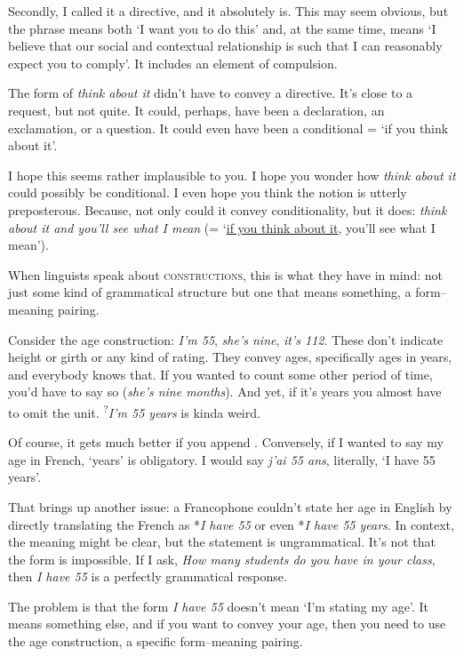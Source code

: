Secondly, I called it a directive, and it absolutely is. This may seem obvious, but the phrase means both `I want you to do this' and, at the same time, means `I believe that our social and contextual relationship is such that I can reasonably expect you to comply'. It includes an element of compulsion.

The form of \textit{think about it} didn't have to convey a directive. It's close to a request, but not quite. It could, perhaps, have been a declaration, an exclamation, or a question. It could even have been a conditional = `if you think about it'.

I hope this seems rather implausible to you. I hope you wonder how \textit{think about it} could possibly be conditional. I even hope you think the notion is utterly preposterous. Because, not only could it convey conditionality, but it does: \textit{think about it and you'll see what I mean} (= `\uline{if you think about it}, you'll see what I mean').

When linguists speak about \textsc{constructions}, this is what they have in mind: not just some kind of grammatical structure but one that means something, a form--meaning pairing.

\bigskip

Consider the age construction: \textit{I'm 55}, \textit{she's nine},
\textit{it's 112}. These don't indicate height or girth or any kind of
rating. They convey ages, specifically ages in years, and everybody knows
that. If you wanted to count some other period of time, you'd have to say
so (\textit{she's nine months}). And yet, if it's years you almost have
to omit the unit. \textsuperscript{?}\textit{I'm 55 years} is kinda
weird.

Of course, it gets much better if you append . Conversely,
if I wanted to say my age in French,  `years' is obligatory.
I would say \textit{j'ai 55 ans}, literally, `I have 55 years'.

That brings up another issue: a Francophone couldn't state her age in
English by directly translating the French as *\textit{I have 55} or even
*\textit{I have 55 years}. In context, the meaning might be clear, but
the statement is ungrammatical. It's not that the form is impossible. If
I ask, \textit{How many students do you have in your class}, then
\textit{I have 55} is a perfectly grammatical response.

The problem is that the form \textit{I have 55} doesn't mean `I'm stating
my age'. It means something else, and if you want to convey your age,
then you need to use the age construction, a specific form--meaning
pairing.

